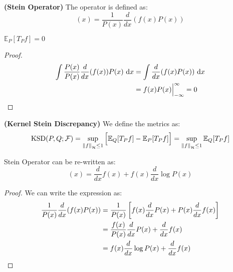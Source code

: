 \begin{definition}{\textbf{(Stein Operator)}}
    The operator is defined as:
    \begin{equation*}
        [T_P f](x) = \frac{1}{P(x)}\frac{d}{dx}(f(x)P(x))
    \end{equation*}
\end{definition}

\begin{lemma}
    $\mathbb{E}_P[T_Pf] = 0$
\end{lemma}
\begin{proof}
    \begin{equation*}
    \begin{aligned}
        \int \frac{P(x)}{P(x)}\frac{d}{dx}(f(x))P(x) \ \mathrm{d} x &= \int  \frac{d}{dx}(f(x)P(x)) \ \mathrm{d} x \\
        &= f(x)P(x)\Big|^\infty_{-\infty} = 0
    \end{aligned}
    \end{equation*}
\end{proof}

\begin{definition}{\textbf{(Kernel Stein Discrepancy)}}
    We define the metrics as:
    \begin{equation*}
        \operatorname{KSD}(P, Q;\mathcal{F}) = \sup_{\left\lVert f\right\rVert_\mathcal{H}\le1}\Big[ \mathbb{E}_Q[T_P f] - \mathbb{E}_P[T_Pf] \Big] = \sup_{\left\lVert f\right\rVert_\mathcal{H}\le1} \mathbb{E}_Q[T_P f] 
    \end{equation*}
\end{definition}

\begin{lemma}
    Stein Operator can be re-written as:
    \begin{equation*}
        [T_Pf] (x) = \frac{d}{dx} f(x) + f(x)\frac{d}{dx}\log P(x)
    \end{equation*}
\end{lemma}
\begin{proof}
    We can write the expression as:
    \begin{equation*}
    \begin{aligned}
        \frac{1}{P(x)}\frac{d}{dx}(f(x)P(x)) &= \frac{1}{P(x)}\left[ f(x)\frac{d}{dx}P(x) + P(x)\frac{d}{dx}f(x) \right] \\
        &= \frac{f(x)}{P(x)}\frac{d}{dx}P(x) + \frac{d}{dx}f(x) \\
        &= f(x)\frac{d}{dx}\log P(x) + \frac{d}{dx}f(x) \\
    \end{aligned}
    \end{equation*}
\end{proof}


